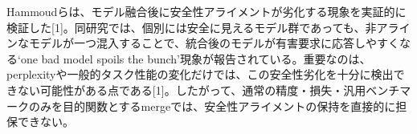 Hammoudらは、モデル融合後に安全性アライメントが劣化する現象を実証的に検証した[1]。同研究では、個別には安全に見えるモデル群であっても、非アラインなモデルが一つ混入することで、統合後のモデルが有害要求に応答しやすくなる`one bad model spoils the bunch'現象が報告されている。重要なのは、perplexityや一般的タスク性能の変化だけでは、この安全性劣化を十分に検出できない可能性がある点である[1]。したがって、通常の精度・損失・汎用ベンチマークのみを目的関数とするmergeでは、安全性アライメントの保持を直接的に担保できない。





